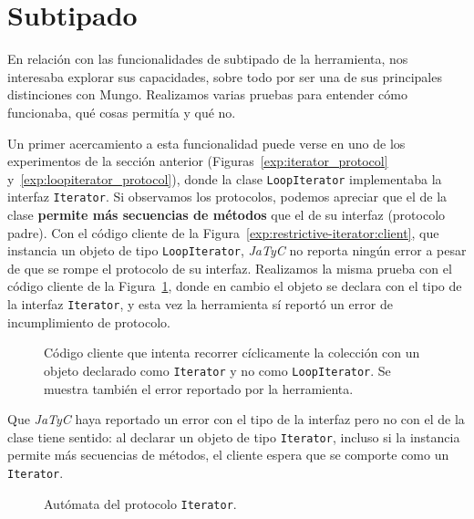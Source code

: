 \section{Subtipado}

En relación con las funcionalidades de subtipado de la herramienta, nos interesaba explorar sus capacidades, sobre todo por ser una de sus principales distinciones con Mungo. Realizamos varias pruebas para entender cómo funcionaba, qué cosas permitía y qué no.

Un primer acercamiento a esta funcionalidad puede verse en uno de los experimentos de la sección anterior (Figuras~\ref{exp:iterator_protocol} y~\ref{exp:loopiterator_protocol}), donde la clase \texttt{LoopIterator} implementaba la interfaz \texttt{Iterator}. Si observamos los protocolos, podemos apreciar que el de la clase \textbf{permite más secuencias de métodos} que el de su interfaz (protocolo padre). Con el código cliente de la Figura~\ref{exp:restrictive-iterator:client}, que instancia un objeto de tipo \texttt{LoopIterator}, \textit{JaTyC} no reporta ningún error a pesar de que se rompe el protocolo de su interfaz. Realizamos la misma prueba con el código cliente de la Figura~\ref{exp:restrictive-iterator:client_2}, donde en cambio el objeto se declara con el tipo de la interfaz \texttt{Iterator}, y esta vez la herramienta sí reportó un error de incumplimiento de protocolo.

\begin{figure}[htbp]
    \centering
    
    \vspace{0.3cm}
    
    \caption{Código cliente que intenta recorrer cíclicamente la colección con un objeto declarado como \texttt{Iterator} y no como \texttt{LoopIterator}. Se muestra también el error reportado por la herramienta.}
    \label{exp:restrictive-iterator:client_2}
\end{figure}

Que \textit{JaTyC} haya reportado un error con el tipo de la interfaz pero no con el de la clase tiene sentido: al declarar un objeto de tipo \texttt{Iterator}, incluso si la instancia permite más secuencias de métodos, el cliente espera que se comporte como un \texttt{Iterator}.

\begin{figure}[htbp]
\centering
{}
\caption{Autómata del protocolo \texttt{Iterator}.}
\label{exp:subtyping:iterator-protocol}
\end{figure}

